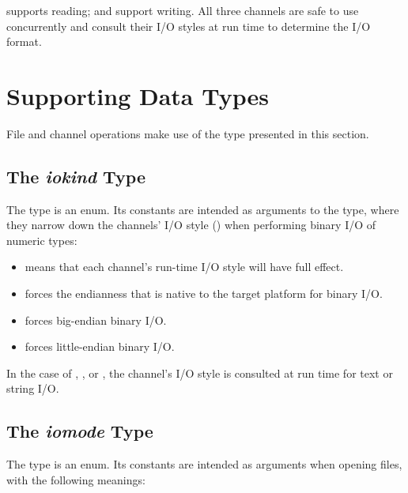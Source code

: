  supports reading;
 and  support writing.
All three channels are safe to use concurrently and
consult their I/O styles at run time to determine the I/O format.


\section{Supporting Data Types}
\label{IO_data_types}

File and channel operations make use of the type presented in this section.


\subsection{The {\em iokind} Type}
\label{IO_iokind_type}

The  type is an enum. Its constants are intended
as arguments to the  type,
where they narrow down the channels' I/O style ()
when performing binary I/O of numeric types:

\begin{itemize}

\item {} means that each channel's run-time I/O style will
      have full effect.      

\item {} forces the endianness that is native
      to the target platform for binary I/O.

\item {} forces big-endian binary I/O.

\item {} forces little-endian binary I/O.

\end{itemize}

In the case of , , or ,
the channel's I/O style is consulted at run time for
text or string I/O.


\subsection{The {\em iomode} Type}
\label{IO_iomode_type}

The  type is an enum. Its constants are intended
as arguments when opening files, with the following meanings:

